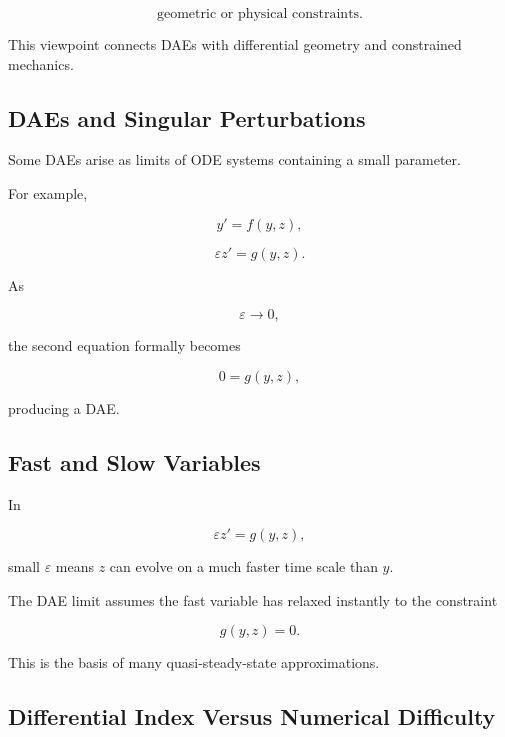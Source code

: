 \[
\boxed{
\text{geometric or physical constraints}.
}
\]

This viewpoint connects DAEs with differential geometry and constrained
mechanics.

\subsection{DAEs and Singular Perturbations}
\label{subsec:dae-singular-perturbation}

Some DAEs arise as limits of ODE systems containing a small parameter.

For example,

\[
\boxed{
y'
=
f(y,z),
}
\]

\[
\boxed{
\varepsilon z'
=
g(y,z).
}
\]

As

\[
\varepsilon\to0,
\]

the second equation formally becomes

\[
\boxed{
0=g(y,z),
}
\]

producing a DAE.

\subsection{Fast and Slow Variables}
\label{subsec:dae-fast-slow-variables}

In

\[
\varepsilon z'
=
g(y,z),
\]

small \(\varepsilon\) means \(z\) can evolve on a much faster time scale
than \(y\).

The DAE limit assumes the fast variable has relaxed instantly to the
constraint

\[
\boxed{
g(y,z)=0.
}
\]

This is the basis of many quasi-steady-state approximations.

\subsection{Differential Index Versus Numerical Difficulty}
\label{subsec:dae-index-numerical-difficulty}


